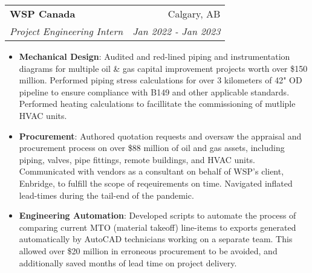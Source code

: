 \documentclass[letterpaper,11pt]{article}
\makeatletter
\newcommand{\resumeItem}[2]{
  \item\small{
    \textbf{#1}{: #2 \vspace{-2pt}}
  }
}
\newcommand{\resumeSubheading}[4]{
  \vspace{-1pt}\item
    \begin{tabular*}{0.97\textwidth}[t]{l@{\extracolsep{\fill}}r}
      \textbf{#1} & #2 \\
      \textit{\small#3} & \textit{\small #4} \\
    \end{tabular*}\vspace{-5pt}
}
\newcommand{\resumeSubSubheading}[2]{
    \begin{tabular*}{0.97\textwidth}{l@{\extracolsep{\fill}}r}
      \textit{\small#1} & \textit{\small #2} \\
    \end{tabular*}\vspace{-5pt}
}
\newcommand{\resumeSubHeadingListEnd}{\end{itemize}}
\newcommand{\resumeItemListStart}{\begin{itemize}}
\newcommand{\resumeItemListEnd}{\end{itemize}\vspace{-5pt}}
\makeatother
\begin{document}

    \resumeSubheading
      {WSP Canada}{Calgary, AB}
      {Project Engineering Intern}{Jan 2022 - Jan 2023}
      \resumeItemListStart
        \resumeItem{Mechanical Design}
          {Audited and red-lined piping and instrumentation diagrams for multiple oil \& gas capital improvement projects worth over \$150 million. Performed piping stress calculations for over 3 kilometers of 42" OD pipeline to ensure compliance with B149 and other applicable standards. Performed heating calculations to facillitate the commissioning of mutliple HVAC units.}
        \resumeItem{Procurement}
          {Authored quotation requests and oversaw the appraisal and procurement process on over \$88 million of oil and gas assets, including piping, valves, pipe fittings, remote buildings, and HVAC units. Communicated with vendors as a consultant on behalf of WSP's client, Enbridge, to fulfill the scope of reqeuirements on time. Navigated inflated lead-times during the tail-end of the pandemic.}
        \resumeItem{Engineering Automation}
          {Developed scripts to automate the process of comparing current MTO (material takeoff) line-items to exports generated automatically by AutoCAD technicians working on a separate team. This allowed over \$20 million in erroneous procurement to be avoided, and additionally saved months of lead time on project delivery.}
      \resumeItemListEnd
\end{document}

